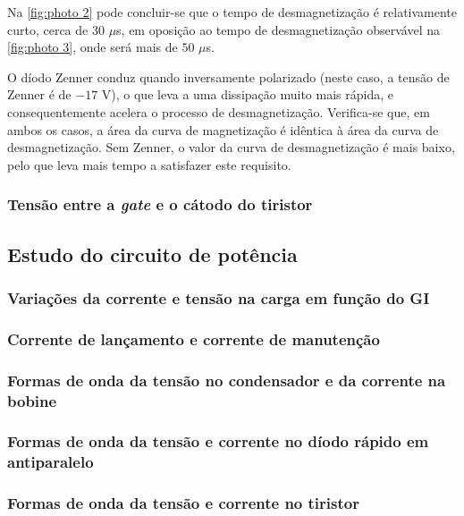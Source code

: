 \documentclass[a4paper,11pt]{article}
\numberwithin{equation}{section}
\begin{document}
Na \autoref{fig:photo 2} pode concluir-se que o tempo de desmagnetização é relativamente curto, cerca de $30$ $\mu$s, em oposição ao tempo de desmagnetização observável na \autoref{fig:photo 3}, onde será mais de $50$ $\mu$s.

O díodo Zenner conduz quando inversamente polarizado (neste caso, a tensão de Zenner é de $-17$ V), o que leva a uma dissipação muito mais rápida, e consequentemente acelera o processo de desmagnetização. Verifica-se que, em ambos os casos, a área da curva de magnetização é idêntica à área da curva de desmagnetização. Sem Zenner, o valor da curva de desmagnetização é mais baixo, pelo que leva mais tempo a satisfazer este requisito. 

\subsubsection{Tensão entre a \textit{gate} e o cátodo do tiristor}

\subsection{Estudo do circuito de potência}

\subsubsection{Variações da corrente e tensão na carga em função do GI}

\subsubsection{Corrente de lançamento e corrente de manutenção}

\subsubsection{Formas de onda da tensão no condensador e da corrente na bobine}

\subsubsection{Formas de onda da tensão e corrente no díodo rápido em antiparalelo}

\subsubsection{Formas de onda da tensão e corrente no tiristor}
\end{document}
